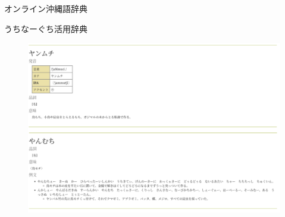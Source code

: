 \documentclass[14pt]{beamer}
\begin{document}


\begin{frame}{オンライン沖縄語辞典}
  \begin{block}{うちなーぐち活用辞典}
    \begin{figure}[ht]
      \centering
      \begin{minipage}{\paperwidth}
        \includegraphics[height=0.6\paperheight,width=0.7\paperwidth]{okinawago-app-katsuyou-jiten.png}
      \end{minipage}
    \end{figure}
  \end{block}
\end{frame}
\end{document}
